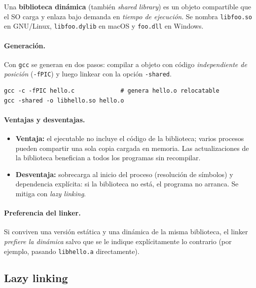 \documentclass[11pt,a4paper]{article}
\begin{document}
\begin{definicion}
Una \textbf{biblioteca dinámica} (también \emph{shared library}) es
un objeto compartible que el SO carga y enlaza bajo demanda en
\emph{tiempo de ejecución}. Se nombra \texttt{libfoo.so} en GNU/Linux,
\texttt{libfoo.dylib} en macOS y \texttt{foo.dll} en Windows.
\end{definicion}

\paragraph{Generación.}
Con \texttt{gcc} se generan en dos pasos: compilar a objeto con
código \emph{independiente de posición} (\texttt{-fPIC}) y luego
linkear con la opción \texttt{-shared}.

\begin{lstlisting}
gcc -c -fPIC hello.c             # genera hello.o relocatable
gcc -shared -o libhello.so hello.o
\end{lstlisting}

\paragraph{Ventajas y desventajas.}
\begin{itemize}[leftmargin=*]
    \item \textbf{Ventaja:} el ejecutable no incluye el código de la
        biblioteca; varios procesos pueden compartir una sola copia
        cargada en memoria. Las actualizaciones de la biblioteca
        benefician a todos los programas sin recompilar.
    \item \textbf{Desventaja:} sobrecarga al inicio del proceso
        (resolución de símbolos) y dependencia explícita: si la
        biblioteca no está, el programa no arranca. Se mitiga con
        \emph{lazy linking}.
\end{itemize}

\paragraph{Preferencia del linker.}
Si conviven una versión estática y una dinámica de la misma
biblioteca, el linker \emph{prefiere la dinámica} salvo que se le
indique explícitamente lo contrario (por ejemplo, pasando
\texttt{libhello.a} directamente).

\subsection{Lazy linking}
\end{document}

